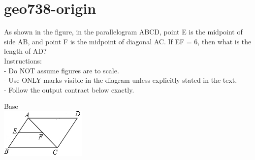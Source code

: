 \documentclass[12pt]{article}
\begin{document}
\section*{geo738-origin}
\noindent\begin{minipage}{\textwidth}
\setlength{\parskip}{4pt}
As shown in the figure, in the parallelogram ABCD, point E is the midpoint of side AB, and point F is the midpoint of diagonal AC. If EF = 6, then what is the length of AD?\\
Instructions:\\
- Do NOT assume figures are to scale.\\
- Use ONLY marks visible in the diagram unless explicitly stated in the text.\\
- Follow the output contract below exactly.\\
\end{minipage}
\begin{center}
\begin{minipage}{0.32\textwidth}\centering
Base\\
\includegraphics[width=0.95\linewidth]{out_rommath_origin/items/geo738-origin/assets/figure.png}
\end{minipage}
\par
\end{center}
\bigskip
\end{document}
